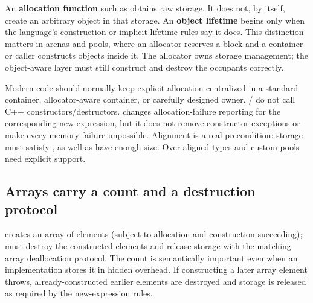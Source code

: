An \textbf{allocation function} such as  obtains raw storage. It does not, by itself, create an arbitrary  object in that storage. An \textbf{object lifetime} begins only when the language's construction or implicit-lifetime rules say it does. This distinction matters in arenas and pools, where an allocator reserves a block and a container or caller constructs objects inside it. The allocator owns storage management; the object-aware layer must still construct and destroy the occupants correctly.

Modern code should normally keep explicit allocation centralized in a standard container, allocator-aware container, or carefully designed owner. / do not call C++ constructors/destructors.  changes allocation-failure reporting for the corresponding new-expression, but it does not remove constructor exceptions or make every memory failure impossible. Alignment is a real precondition: storage must satisfy , as well as have enough size. Over-aligned types and custom pools need explicit support.

\subsection{Arrays carry a count and a destruction protocol}\label{01-foundations-i-ch004-arrays-carry-a-count-and-a-destruction-protocol}

\hypertarget{01-foundations-i-ch004-arrays-carry-a-count-and-a-destruction-protocol}{}

 creates an array of  elements (subject to allocation and construction succeeding);  must destroy the constructed elements and release storage with the matching array deallocation protocol. The count is semantically important even when an implementation stores it in hidden overhead. If constructing a later array element throws, already-constructed earlier elements are destroyed and storage is released as required by the new-expression rules.

